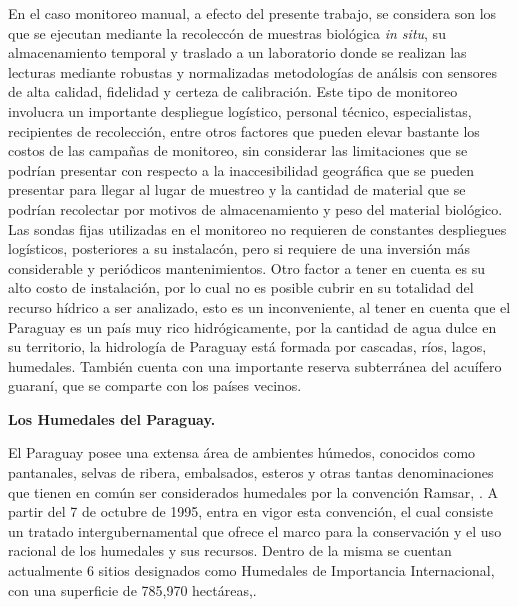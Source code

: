 En el caso monitoreo manual, a efecto del presente trabajo, se considera son los que se ejecutan mediante la recolecc\'on de muestras biol\'ogica \textit{in situ}, su almacenamiento temporal y traslado a un laboratorio donde se realizan las lecturas mediante robustas y normalizadas metodolog\'ias de an\'alsis con sensores de alta calidad, fidelidad y certeza de calibraci\'on.
Este tipo de monitoreo involucra un importante despliegue log\'istico, personal t\'ecnico, especialistas, recipientes de recolecci\'on, entre otros factores que pueden elevar bastante los costos de las campa\~nas de monitoreo, sin considerar las limitaciones que se podr\'ian presentar con respecto a la inaccesibilidad geogr\'afica que se pueden presentar para llegar al lugar de muestreo y la cantidad de material que se podr\'ian recolectar por motivos de almacenamiento y peso del material biol\'ogico.   
Las sondas fijas utilizadas en el monitoreo no requieren de constantes despliegues log\'isticos, posteriores a su instalac\'on, pero si requiere de una inversi\'on m\'as considerable y peri\'odicos mantenimientos. 
Otro factor a tener en cuenta es su alto costo de instalación, por lo cual no es posible cubrir en su totalidad del recurso h\'idrico a ser analizado, esto es un inconveniente, al tener en cuenta que el Paraguay es un pa\'is muy rico hidr\'ogicamente, por la cantidad de agua dulce en su territorio, la hidrología de Paraguay está formada por cascadas, ríos, lagos,  humedales. También cuenta con una importante reserva subterránea del acuífero guaraní, que se comparte con los países vecinos.

\textbf{Los Humedales del  Paraguay.}

El Paraguay posee una extensa \'area de ambientes h\'umedos, conocidos como pantanales, selvas de ribera, embalsados, esteros y otras tantas denominaciones que tienen en com\'un ser considerados humedales por la convenci\'on Ramsar, \cite{salas-duenas-2015}. A partir del 7 de octubre de 1995, entra en vigor esta convención, el cual consiste un tratado intergubernamental que ofrece el marco para la conservación y el uso racional de los humedales y sus recursos. Dentro de la misma se cuentan actualmente 6 sitios designados como Humedales de Importancia Internacional, con una superficie de 785,970 hectáreas,\cite{ramsarWEB}.

